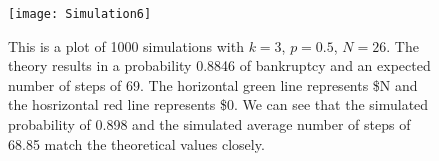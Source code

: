 \documentclass{article}
\begin{document}
\begin{figure}[r]
    \centering
    \texttt{[image: Simulation6]}
    \caption{This is a plot of 1000 simulations with $k = 3$, $p = 0.5$, $N = 26$. The theory results in a probability 0.8846 of bankruptcy and an expected number of steps of 69. The horizontal green line represents \$N and the hosrizontal red line represents \$0. We can see that the simulated probability of 0.898 and the simulated average number of steps of 68.85 match the theoretical values closely.}
    \label{fig:sim6}
\end{figure}

\end{document}
